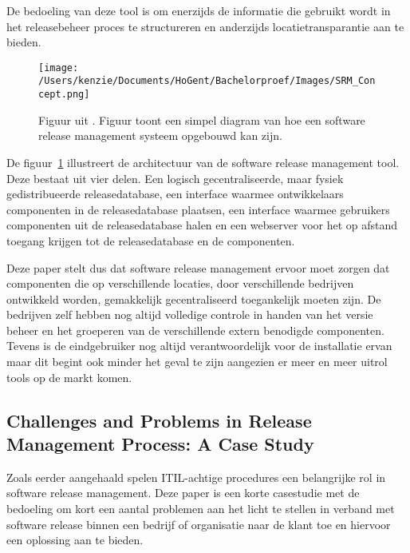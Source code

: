 De bedoeling van deze tool is om enerzijds de informatie die gebruikt wordt in het releasebeheer proces te structureren en anderzijds locatietransparantie aan te bieden.
\begin{figure}[!htbp]
    \centering
    \texttt{[image: /Users/kenzie/Documents/HoGent/Bachelorproef/Images/SRM\_Concept.png]}
    \caption{Figuur uit \autocite{Hoek2002}. Figuur toont een simpel diagram van hoe een software release management systeem opgebouwd kan zijn.}
    \label{fig:SRM_arch}
\end{figure}
De figuur~\ref{fig:SRM_arch} illustreert de architectuur van de software release management tool. Deze bestaat uit vier delen. Een logisch gecentraliseerde, maar fysiek gedistribueerde releasedatabase, een interface waarmee ontwikkelaars componenten in de releasedatabase plaatsen, een interface waarmee gebruikers componenten uit de releasedatabase halen en een webserver voor het op afstand toegang krijgen tot de releasedatabase en de componenten.

Deze paper \autocite{Hoek2002} stelt dus dat software release management ervoor moet zorgen dat componenten die op verschillende locaties, door verschillende bedrijven ontwikkeld worden, gemakkelijk gecentraliseerd toegankelijk moeten zijn. De bedrijven zelf hebben nog altijd volledige controle in handen van het versie beheer en het groeperen van de verschillende extern benodigde componenten. Tevens is de eindgebruiker nog altijd verantwoordelijk voor de installatie ervan maar dit begint ook minder het geval te zijn aangezien er meer en meer uitrol tools op de markt komen.

\subsection{Challenges and Problems in Release Management Process: A Case Study}
Zoals eerder aangehaald spelen ITIL-achtige procedures een belangrijke rol in software release management. Deze paper \autocite{Lahtela2011} is een korte casestudie met de bedoeling om kort een aantal problemen aan het licht te stellen in verband met software release binnen een bedrijf of organisatie naar de klant toe en hiervoor een oplossing aan te bieden.

